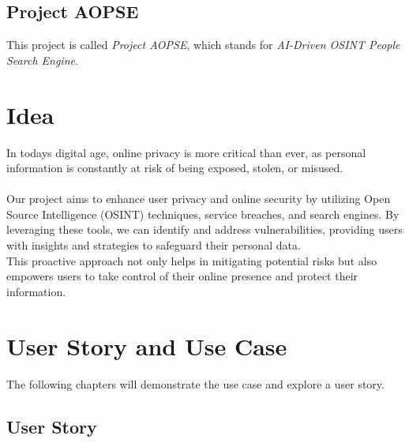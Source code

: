 \documentclass[
    a4paper,
    pagesize,
	pdftex,
    12pt,
]{scrartcl}
\begin{document}
\subsection{Project AOPSE}
This project is called \textit{Project AOPSE}, which stands for \textit{AI-Driven OSINT People Search Engine}.

\section{Idea}
In todays digital age, online privacy is more critical than ever, as personal information is constantly at risk of being exposed, stolen, or misused.
\\ \\
Our project aims to enhance user privacy and online security by utilizing Open Source Intelligence (OSINT) techniques, service breaches, and search engines. By leveraging these tools, we can identify and address vulnerabilities, providing users with insights and strategies to safeguard their personal data. \\
This proactive approach not only helps in mitigating potential risks but also empowers users to take control of their online presence and protect their information.

\section{User Story and Use Case}
The following chapters will demonstrate the use case and explore a user story.

\subsection{User Story}
\end{document}
